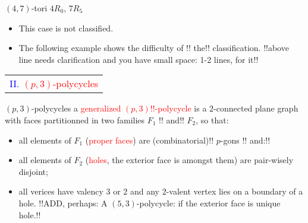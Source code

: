 \documentclass[%
pdf,
colorBG,
slideColor,
]{prosper}
\begin{document}
\begin{slide}{$(4,7)$-tori $4R_0$, $7R_5$}
\begin{itemize}
\item This case is not classified.
\item The following example shows the difficulty of 
!!%
the!! classification.
!!above line needs clarification and you have small space: 1-2 lines, 
for it!!
\begin{center}
\begin{minipage}{5.2cm}
\centering
{}\par
\end{minipage}
\end{center}

\end{itemize}
\end{slide}




\begin{slide}{}
\begin{center}
{\Huge 
\begin{tabular*}{7cm}{c}
\\[-0.5cm]
\textcolor{blue}{II. }\textcolor{red}{$(p,3)$-polycycles}
\end{tabular*}
}
\end{center}
\end{slide}




\begin{slide}{$(p,3)$-polycycles}
a \textcolor{red}{generalized $(p,3)!!$-polycycle} is a 
$2$-connected plane 
graph with faces partitionned in two families $F_1$
!!%
and!! $F_2$, so that:
\begin{itemize}
\item all elements of $F_1$ (\textcolor{red}{proper faces}) are
(combinatorial)!! $p$-gons
!!%
and:!!
\item all elements of $F_2$ (\textcolor{red}{holes}, the exterior face
is amongst them) are pair-wisely disjoint;
\item all verices have valency $3$ or $2$ and any $2$-valent vertex lies on a 
boundary of a hole.
!!ADD, perhaps: A $(5,3)$-polycycle: if the exterior face is unique 
hole.!!
\end{itemize}

\begin{center}
\end{center}

\end{slide}
\end{document}
